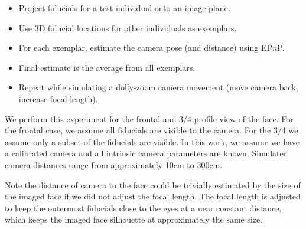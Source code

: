 \documentclass[runningheads]{llncs}
\newcommand {\EPnP} {EP$n$P}
\begin{document}
\begin{itemize}
\item Project fiducials for a test individual onto an image plane.
\item Use 3D fiducial locations for other individuals as exemplars.
\item For each exemplar, estimate the camera pose (and distance) using \EPnP.
\item Final estimate is the average from all exemplars.
\item Repeat while simulating a dolly-zoom camera movement (move camera back, increase focal length).  
\end{itemize}

We perform this experiment for the frontal and $3/4$ profile view of the face.  
For the frontal case, we assume all fiducials are visible to the camera.  
For the $3/4$ we assume only a subset of the fiducials are visible. 
In this work, we assume we have a calibrated camera and all intrinsic camera parameters are known.  
Simulated camera distances range from approximately 10cm to 300cm.

Note the distance of camera to the face could be trivially estimated by the size of the imaged face if we did not adjust the focal length. 
The focal length is adjusted to keep the outermost fiducials close to the eyes at a near constant distance, which keeps the imaged face silhouette at approximately the same size.
\end{document}
